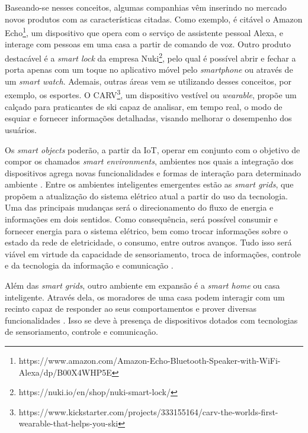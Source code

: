 Baseando-se nesses conceitos, algumas companhias vêm inserindo no mercado novos produtos com as características citadas. Como exemplo, é citável o Amazon Echo\textsuperscript{\textregistered}\footnote{https://www.amazon.com/Amazon-Echo-Bluetooth-Speaker-with-WiFi-Alexa/dp/B00X4WHP5E}, um dispositivo que opera com o serviço de assistente pessoal Alexa, e interage com pessoas em uma casa a partir de comando de voz. Outro produto destacável é a \textit{smart lock} da empresa Nuki\textsuperscript{\textregistered}\footnote{https://nuki.io/en/shop/nuki-smart-lock/}, pelo qual é possível abrir e fechar a porta apenas com um toque no aplicativo móvel pelo \textit{smartphone} ou através de um \textit{smart watch}. Ademais, outras áreas vem se utilizando desses conceitos, por exemplo, os esportes. O CARV\textsuperscript{\textregistered}\footnote{https://www.kickstarter.com/projects/333155164/carv-the-worlds-first-wearable-that-helps-you-ski}, um dispositivo vestível ou \textit{wearable}, propõe um calçado para praticantes de ski capaz de analisar, em tempo real, o modo de esquiar e fornecer informações detalhadas, visando melhorar o desempenho dos usuários.

Os \textit{smart objects} poderão, a partir da IoT, operar em conjunto com o objetivo de compor os chamados \textit{smart environments}, ambientes nos quais a integração dos dispositivos agrega novas funcionalidades e formas de interação para determinado ambiente \cite{Asano2016}. Entre os ambientes inteligentes emergentes estão as \textit{smart grids}, que propõem a atualização do sistema elétrico atual a partir do uso da tecnologia. Uma das principais mudanças será o direcionamento do fluxo de energia e informações em dois sentidos. Como consequência, será possível consumir e fornecer energia para o sistema elétrico, bem como trocar informações sobre o estado da rede de eletricidade, o consumo, entre outros avanços. Tudo isso será viável em virtude da capacidade de sensoriamento, troca de informações, controle e da tecnologia da informação e comunicação \cite{Cecilia2016}.  

Além das \textit{smart grids}, outro ambiente em expansão é a \textit{smart home} ou casa inteligente. Através dela, os moradores de uma casa podem interagir com um recinto capaz de responder ao seus comportamentos e prover diversas funcionalidades \cite{DeSilva2012}. Isso se deve à presença de dispositivos dotados com tecnologias de sensoriamento, controle e comunicação. 

